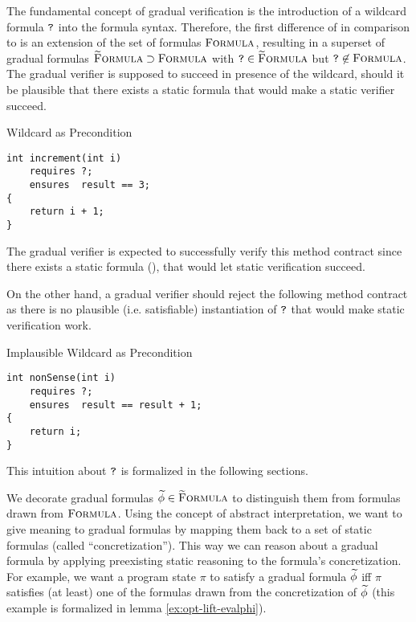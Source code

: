 
The fundamental concept of gradual verification is the introduction of a wildcard formula $\textup{\texttt{?}}$ into the formula syntax.
Therefore, the first difference of \gvl in comparison to \svl is an extension of the set of formulas $\textup{\textsc{Formula}}$, resulting in a superset of gradual formulas $\textup{\textsc{\ensuremath{\widetilde{\text{F}}}ormula}} \supset \textup{\textsc{Formula}}$ with $\textup{\texttt{?}} \in \textup{\textsc{\ensuremath{\widetilde{\text{F}}}ormula}}$ but $\textup{\texttt{?}} \not \in \textup{\textsc{Formula}}$.
The gradual verifier is supposed to succeed in presence of the wildcard, should it be plausible that there exists a static formula that would make a static verifier succeed.
\begin{example}{Wildcard as Precondition}
\begin{lstlisting}
int increment(int i)
    requires ?;
    ensures  result == 3;
{
    return i + 1;
}
\end{lstlisting}
The gradual verifier is expected to successfully verify this method contract since there exists a static formula (), that would let static verification succeed.
\end{example}

On the other hand, a gradual verifier should reject the following method contract as there is no plausible (i.e. satisfiable) instantiation of $\textup{\texttt{?}}$ that would make static verification work.
\begin{example}{Implausible Wildcard as Precondition}
\begin{lstlisting}
int nonSense(int i)
    requires ?;
    ensures  result == result + 1;
{
    return i;
}
\end{lstlisting}
\end{example}

This intuition about $\textup{\texttt{?}}$ is formalized in the following sections.

We decorate gradual formulas $\widetilde{\phi} \in \textup{\textsc{\ensuremath{\widetilde{\text{F}}}ormula}}$ to distinguish them from formulas drawn from $\textup{\textsc{Formula}}$.
Using the concept of abstract interpretation, we want to give meaning to gradual formulas by mapping them back to a set of static formulas (called “concretization”).
This way we can reason about a gradual formula by applying preexisting static reasoning to the formula's concretization.
For example, we want a program state $\pi$ to satisfy a gradual formula $\widetilde{\phi}$ iff $\pi$ satisfies (at least) one of the formulas drawn from the concretization of $\widetilde{\phi}$ (this example is formalized in lemma \ref{ex:opt-lift-evalphi}).

